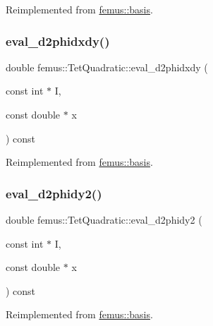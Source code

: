 Reimplemented from \mbox{\hyperlink{classfemus_1_1basis_a0a9839e75d1c9c8302486fc072eed028}{femus\+::basis}}.

\mbox{\label{classfemus_1_1_tet_quadratic_a2fcd1051ba5599c11a1d1c570c13d9f1}} 
\subsubsection{\texorpdfstring{eval\+\_\+d2phidxdy()}{eval\_d2phidxdy()}}
{\footnotesize\ttfamily double femus\+::\+Tet\+Quadratic\+::eval\+\_\+d2phidxdy (\begin{DoxyParamCaption}\item[{const int $\ast$}]{I,  }\item[{const double $\ast$}]{x }\end{DoxyParamCaption}) const\hspace{0.3cm}{\ttfamily [virtual]}}



Reimplemented from \mbox{\hyperlink{classfemus_1_1basis_ac9feaf9e60421143db2a3708f3c7fa48}{femus\+::basis}}.

\mbox{\label{classfemus_1_1_tet_quadratic_ab6dcc72f0cf2bdfa021645dbc164e07b}} 
\subsubsection{\texorpdfstring{eval\+\_\+d2phidy2()}{eval\_d2phidy2()}}
{\footnotesize\ttfamily double femus\+::\+Tet\+Quadratic\+::eval\+\_\+d2phidy2 (\begin{DoxyParamCaption}\item[{const int $\ast$}]{I,  }\item[{const double $\ast$}]{x }\end{DoxyParamCaption}) const\hspace{0.3cm}{\ttfamily [virtual]}}



Reimplemented from \mbox{\hyperlink{classfemus_1_1basis_a0febb29fe4b32213ff8d6d428f7241cd}{femus\+::basis}}.

